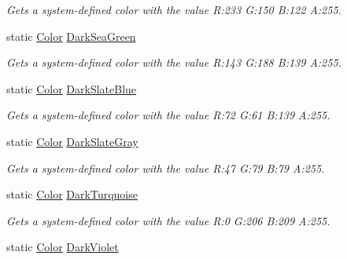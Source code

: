 \begin{DoxyCompactItemize}
\begin{DoxyCompactList}\small\item\em Gets a system-\/defined color with the value R\+:233 G\+:150 B\+:122 A\+:255.\end{DoxyCompactList}\item 
static \hyperlink{structMicrosoft_1_1Xna_1_1Framework_1_1Color}{Color} \hyperlink{structMicrosoft_1_1Xna_1_1Framework_1_1Color_a227ffaed17fc3f97b938b1fd73243cac}{Dark\+Sea\+Green}
\begin{DoxyCompactList}\small\item\em Gets a system-\/defined color with the value R\+:143 G\+:188 B\+:139 A\+:255.\end{DoxyCompactList}\item 
static \hyperlink{structMicrosoft_1_1Xna_1_1Framework_1_1Color}{Color} \hyperlink{structMicrosoft_1_1Xna_1_1Framework_1_1Color_aa104c1a7f64332c5564745b505685363}{Dark\+Slate\+Blue}
\begin{DoxyCompactList}\small\item\em Gets a system-\/defined color with the value R\+:72 G\+:61 B\+:139 A\+:255.\end{DoxyCompactList}\item 
static \hyperlink{structMicrosoft_1_1Xna_1_1Framework_1_1Color}{Color} \hyperlink{structMicrosoft_1_1Xna_1_1Framework_1_1Color_a3147c7a5bc8591e985ede57baa96c016}{Dark\+Slate\+Gray}
\begin{DoxyCompactList}\small\item\em Gets a system-\/defined color with the value R\+:47 G\+:79 B\+:79 A\+:255.\end{DoxyCompactList}\item 
static \hyperlink{structMicrosoft_1_1Xna_1_1Framework_1_1Color}{Color} \hyperlink{structMicrosoft_1_1Xna_1_1Framework_1_1Color_ae09720166ade88f2f82c0f2f9a067130}{Dark\+Turquoise}
\begin{DoxyCompactList}\small\item\em Gets a system-\/defined color with the value R\+:0 G\+:206 B\+:209 A\+:255.\end{DoxyCompactList}\item 
static \hyperlink{structMicrosoft_1_1Xna_1_1Framework_1_1Color}{Color} \hyperlink{structMicrosoft_1_1Xna_1_1Framework_1_1Color_af9eb01b5178718d53d8664c358b6e91d}{Dark\+Violet}

\end{DoxyCompactItemize}
